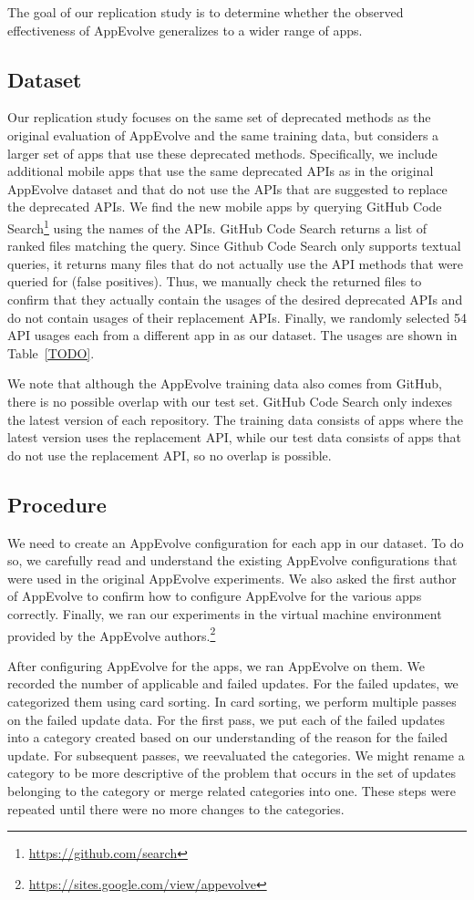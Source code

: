 The goal of our replication study is to determine whether the observed
effectiveness of AppEvolve generalizes to a wider range of apps.

\subsection{Dataset}
Our replication study focuses on the same set of deprecated methods as the
original evaluation of AppEvolve and the same training data, but considers
a larger set of apps that use these deprecated methods.  Specifically, we
include additional mobile apps that use the same deprecated APIs as in the
original AppEvolve dataset and that do not use the APIs that are suggested
to replace the deprecated APIs.  We find the new mobile apps by querying
GitHub Code Search\footnote{\url{https://github.com/search}} using the
names of the APIs. GitHub Code Search returns a list of ranked files
matching the query. Since Github Code Search only supports textual queries,
it returns many files that do not actually use the API methods that were
queried for (false positives).  Thus, we manually check the returned files
to confirm that they actually contain the usages of the desired deprecated
APIs and do not contain usages of their replacement APIs. Finally, we
randomly selected 54 API usages each from a different app in as our
dataset.  The usages are shown in Table~\ref{TODO}.

We note that although the AppEvolve training data also comes from GitHub,
there is no possible overlap with our test set.  GitHub Code Search only
indexes the latest version of each repository.  The training data consists
of apps where the latest version uses the replacement API, while our test
data consists of apps that do not use the replacement API, so no overlap is
possible.

\subsection{Procedure}
We need to create an AppEvolve configuration for each app in our
dataset. To do so, we carefully read and understand the existing AppEvolve
configurations that were used in the original AppEvolve experiments. We
also asked the first author of AppEvolve to confirm how to configure
AppEvolve for the various apps correctly. Finally, we ran our experiments
in the virtual machine environment provided by the AppEvolve
authors.\footnote{\url{https://sites.google.com/view/appevolve}}

After configuring AppEvolve for the apps, we ran AppEvolve on them. We
recorded the number of applicable and failed updates. For the failed
updates, we categorized them using card sorting\cite{...}. In card sorting,
we perform multiple passes on the failed update data. For the first pass,
we put each of the failed updates into a category created based on our
understanding of the reason for the failed update. For subsequent passes,
we reevaluated the categories. We might rename a category to be more
descriptive of the problem that occurs in the set of updates belonging to
the category or merge related categories into one. These steps were
repeated until there were no more changes to the categories.
